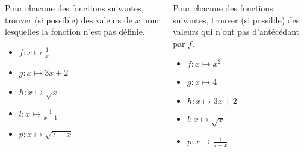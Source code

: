 \documentclass[14pt, aspectratio=169]{beamer}
\begin{document}
\begin{frame}
  \begin{columns}[t]
    \begin{column}{.5\textwidth}
      Pour chacune des fonctions suivantes, trouver (si possible) des valeurs de $x$ pour lesquelles la fonction n'est pas définie.
      \begin{itemize}
        \item $f:x\mapsto\frac{1}{x}$
        \item $g:x\mapsto3x+2$
        \item $h:x\mapsto\sqrt{x}$
        \item $l:x\mapsto\frac{1}{x-1}$
        \item $p:x\mapsto\sqrt{7-x}$
      \end{itemize}
    \end{column}
    \begin{column}{.5\textwidth}
      Pour chacune des fonctions suivantes, trouver (si possible) des valeurs qui n'ont pas d'antécédant par $f$.
      \begin{itemize}
        \item $f:x\mapsto x^2$
        \item $g:x\mapsto4$
        \item $h:x\mapsto3x+2$
        \item $l:x\mapsto\sqrt{x}$
        \item $p:x\mapsto\frac{1}{7-x}$
      \end{itemize}
      
    \end{column}
  \end{columns}
\end{frame}
\end{document}
